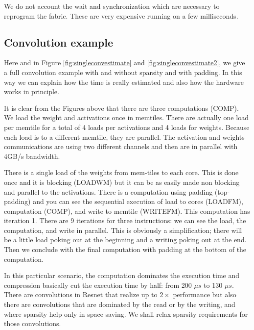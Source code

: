 \documentclass[sigconf]{acmart}
\begin{document}
We do not account the wait and synchronization which are necessary to
reprogram the fabric. These are very expensive running on a few
milliseconds.


\subsection{Convolution example}
Here and in Figure \ref{fig:singleconvestimate} and
\ref{fig:singleconvestimate2}, we give a full convolution example with
and without sparsity and with padding. In this way we can explain how
the time is really estimated and also how the hardware works in
principle.

It is clear from the Figures above that there are three computations
(COMP). We load the weight and activations once in memtiles. There are
actually one load per memtile for a total of 4 loads per activations
and 4 loads for weights. Because each load is to a different
memtile, they are parallel.  The activation and weights communications
are using two different channels and then are in parallel with 4GB/s
bandwidth.

There is a single load of the weights from mem-tiles to each
core. This is done once and it is blocking (LOADWM) but it can be as
easily made non blocking and parallel to the activations. There is a
computation using padding (top-padding) and you can see the sequential
execution of load to cores (LOADFM), computation (COMP), and write to
memtile (WRITEFM). This computation has iteration 1. There are 9
iterations for three instructions: we can see the load, the
computation, and write in parallel. This is obviously a
simplification; there will be a little load poking out at the
beginning and a writing poking out at the end.  Then we conclude with
the final computation with padding at the bottom of the computation.

In this particular scenario, the computation dominates the execution
time and compression basically cut the execution time by half: from
200 $\mu s$ to 130 $\mu s$. There are convolutions in Resnet that
realize up to $2\times$ performance but also there are convolutions
that are dominated by the read or by the writing, and where sparsity
help only in space saving. We shall relax sparsity requirements for
those convolutions.

\end{document}
